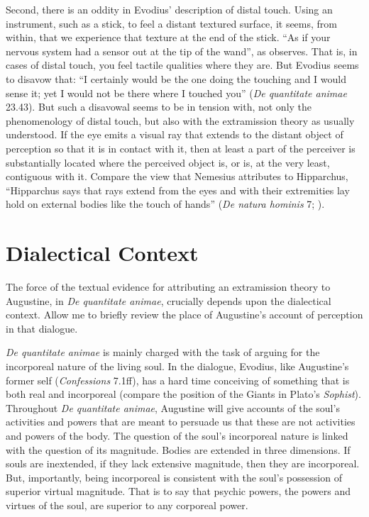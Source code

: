 \documentclass[12pt]{article}
\begin{document}
Second, there is an oddity in Evodius' description of distal touch. Using an instrument, such as a stick, to feel a distant textured surface, it seems, from within, that we experience that texture at the end of the stick. ``As if your nervous system had a sensor out at the tip of the wand'', as \citet[47]{Dennett:1993ce} observes. That is, in cases of distal touch, you feel tactile qualities where they are. But Evodius seems to disavow that: ``I certainly would be the one doing the touching and I would sense it; yet I would not be there where I touched you'' (\emph{De quantitate animae} 23.43). But such a disavowal seems to be in tension with, not only the phenomenology of distal touch, but also with the extramission theory as usually understood. If the eye emits a visual ray that extends to the distant object of perception so that it is in contact with it, then at least a part of the perceiver is substantially located where the perceived object is, or is, at the very least, contiguous with it. Compare the view that Nemesius attributes to Hipparchus, ``Hipparchus says that rays extend from the eyes and with their extremities lay hold on external bodies like the touch of hands'' (\emph{De natura hominis} 7; \citealt[104]{Sharples:2008aa}).
 

\section{Dialectical Context} %
\label{sec:dialectical_context}

The force of the textual evidence for attributing an extramission theory to Augustine, in \emph{De quantitate animae}, crucially depends upon the dialectical context. Allow me to briefly review the place of Augustine's account of perception in that dialogue.

\emph{De quantitate animae}  is mainly charged with the task of arguing for the incorporeal nature of the living soul. In the dialogue, Evodius, like Augustine’s former self (\emph{Confessions} 7.1ff), has a hard time conceiving of something that is both real and incorporeal (compare the position of the Giants in Plato's \emph{Sophist}). Throughout \emph{De quantitate animae}, Augustine will give accounts of the soul’s activities and powers that are meant to persuade us that these are not activities and powers of the body. The question of the soul’s incorporeal nature is linked with the question of its magnitude. Bodies are extended in three dimensions. If souls are inextended, if they lack extensive magnitude, then they are incorporeal. But, importantly, being incorporeal is consistent with the soul’s possession of superior virtual magnitude. That is to say that psychic powers, the powers and virtues of the soul, are superior to any corporeal power. 
\end{document}
